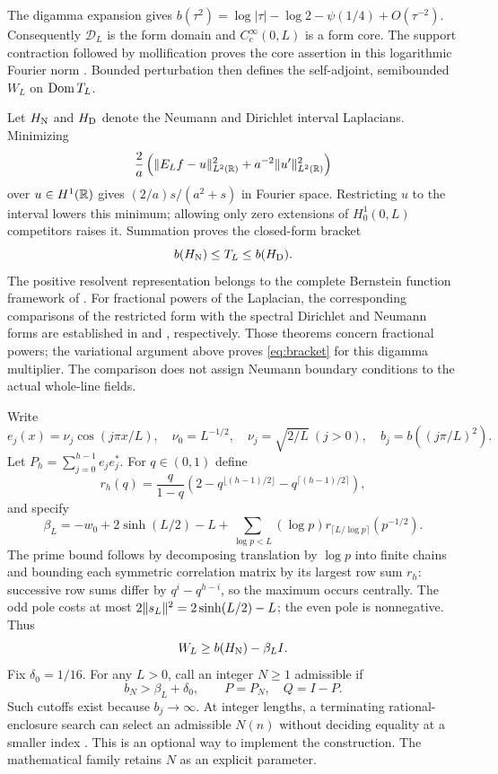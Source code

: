 The digamma expansion \cite{DLMF} gives
$b(\tau^2)=\log|\tau|-\log2-\psi(1/4)+O(\tau^{-2})$.
Consequently $\mathcal D_L$ is the form domain and $C_c^\infty(0,L)$ is
a form core. The support contraction followed by mollification proves the
core assertion in this logarithmic Fourier norm \cite[Section 3]{Companion}.
Bounded perturbation then
defines the self-adjoint, semibounded $W_L$ on $\operatorname{Dom} T_L$.

Let $H_{\rm N}$ and $H_{\rm D}$ denote the Neumann and Dirichlet interval
Laplacians. Minimizing
\[
\frac2a\left(\lVert E_Lf-u\rVert_{L^2(\mathbb R)}^2+a^{-2}\lVert u'\rVert_{L^2(\mathbb R)}^2\right)
\]
over $u\in H^1(\mathbb R)$ gives $(2/a)s/(a^2+s)$ in Fourier space.
Restricting $u$ to the interval lowers this minimum; allowing only zero
extensions of $H_0^1(0,L)$ competitors raises it. Summation proves the
closed-form bracket
\begin{equation}\label{eq:bracket}
b(H_{\rm N})\le T_L\le b(H_{\rm D}).
\end{equation}
The positive resolvent representation belongs to the complete Bernstein
function framework of \cite{KM}. For fractional powers of the Laplacian,
the corresponding comparisons of the restricted form with the spectral
Dirichlet and Neumann forms are established in
\cite[Theorem 2]{MN} and \cite[Theorem 3]{Nazarov}, respectively.
Those theorems concern fractional powers; the variational argument above
proves \eqref{eq:bracket} for this digamma multiplier. The comparison does
not assign Neumann boundary conditions to the actual whole-line fields.

Write
\[
e_j(x)=\nu_j\cos(j\pi x/L),\quad
\nu_0=L^{-1/2},\quad\nu_j=\sqrt{2/L}\ (j>0),\quad
b_j=b((j\pi/L)^2).
\]
Let $P_h=\sum_{j=0}^{h-1}e_je_j^*$. For $q\in(0,1)$ define
\[
r_h(q)=\frac{q}{1-q}
\left(2-q^{\lfloor(h-1)/2\rfloor}-q^{\lceil(h-1)/2\rceil}\right),
\]
and specify
\begin{equation}\label{eq:beta}
\beta_L=-w_0+2\sinh(L/2)-L+
\sum_{\log p<L}(\log p)r_{\lceil L/\log p\rceil}(p^{-1/2}).
\end{equation}
The prime bound follows by decomposing translation by $\log p$ into finite
chains and bounding each symmetric correlation matrix by its largest row
sum $r_h$: successive row sums differ by $q^i-q^{h-i}$, so the
maximum occurs centrally. The odd pole costs at most $2\lVert s_L\rVert^2=2\sinh(L/2)-L$;
the even pole is nonnegative. Thus
\begin{equation}\label{eq:lower}
W_L\ge b(H_{\rm N})-\beta_LI.
\end{equation}
Fix $\delta_0=1/16$. For any $L>0$, call an integer $N\ge1$ admissible if
\begin{equation}\label{eq:N}
b_N>\beta_L+\delta_0,\qquad P=P_N,\quad Q=I-P.
\end{equation}
Such cutoffs exist because $b_j\to\infty$. At integer lengths, a terminating
rational-enclosure search can select an admissible $N(n)$ without deciding
equality at a smaller index \cite[Section 4]{Companion}. This is an optional
way to implement the construction. The mathematical family retains $N$
as an explicit parameter.

